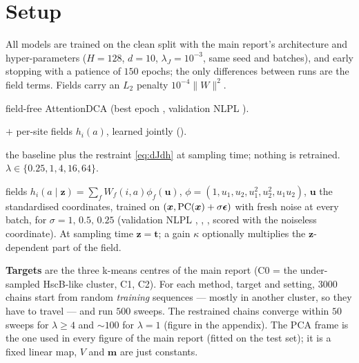 \section{Setup}\label{sec:setup}
All models are trained on the clean split with the main report's architecture and hyper-parameters
($H=128$, $d=10$, $\lambda_J=10^{-3}$, same seed and batches), and early stopping with a patience of
$150$ epochs; the only differences between runs are the field terms. Fields carry an $L_2$ penalty
$10^{-4}\|W\|^2$.
\begin{description}[leftmargin=1.2em,itemsep=1pt]
\item[Baseline] field-free AttentionDCA (best epoch \EpBase, validation NLPL \ValBase).
\item[M2] $+$ per-site fields $h_i(a)$, learned jointly (\ValMtwo).
\item[C1] the baseline plus the restraint \eqref{eq:dJdh} at sampling time; nothing is retrained.
      $\lambda\in\{0.25,1,4,16,64\}$.
\item[C3] fields $h_i(a\mid\bm z)=\sum_fW_f(i,a)\phi_f(\bm u)$, $\phi=(1,u_1,u_2,u_1^2,u_2^2,u_1u_2)$,
      $\bm u$ the standardised coordinates, trained on $(\bm x,\mathrm{PC}(\bm x)+\sigma\bm\epsilon)$ with fresh
      noise at every batch, for $\sigma=1,\,0.5,\,0.25$ (validation NLPL \ValCthreeOne, \ValCthree,
      \ValCthreeQ, scored with the noiseless coordinate). At sampling time $\bm z=\bm t$; a gain
      $\kappa$ optionally multiplies the $\bm z$-dependent part of the field.
\end{description}
\textbf{Targets} are the three k-means centres of the main report (C0 = the under-sampled HscB-like
cluster, C1, C2). For each method, target and setting, $3000$ chains start from random
\emph{training} sequences --- mostly in another cluster, so they have to travel --- and run $500$
sweeps. The restrained chains converge within $50$ sweeps for $\lambda\ge4$ and $\sim100$ for
$\lambda=1$ (figure in the appendix). The PCA frame is the one used in every figure of the main
report (fitted on the test set); it is a fixed linear map, $V$ and $\bm m$ are just constants.

